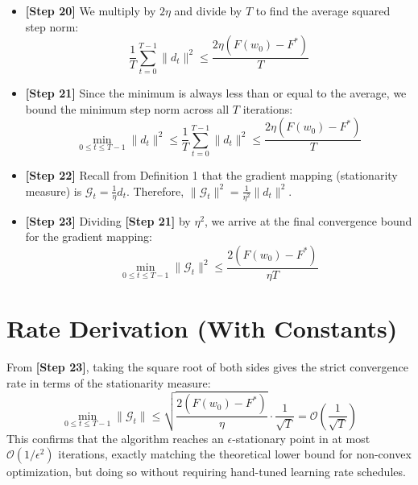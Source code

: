 \documentclass[11pt]{article}
\begin{document}
\begin{itemize}
    \item \textbf{[Step 20]} We multiply by $2\eta$ and divide by $T$ to find the average squared step norm:
    \begin{equation}
        \frac{1}{T} \sum_{t=0}^{T-1} \|d_t\|^2 \leq \frac{2\eta (F(w_0) - F^*)}{T}
    \end{equation}
    
    \item \textbf{[Step 21]} Since the minimum is always less than or equal to the average, we bound the minimum step norm across all $T$ iterations:
    \begin{equation}
        \min_{0 \leq t \leq T-1} \|d_t\|^2 \leq \frac{1}{T} \sum_{t=0}^{T-1} \|d_t\|^2 \leq \frac{2\eta (F(w_0) - F^*)}{T}
    \end{equation}
    
    \item \textbf{[Step 22]} Recall from Definition 1 that the gradient mapping (stationarity measure) is $\mathcal{G}_t = \frac{1}{\eta} d_t$. Therefore, $\|\mathcal{G}_t\|^2 = \frac{1}{\eta^2} \|d_t\|^2$.
    
    \item \textbf{[Step 23]} Dividing \textbf{[Step 21]} by $\eta^2$, we arrive at the final convergence bound for the gradient mapping:
    \begin{equation}
        \min_{0 \leq t \leq T-1} \|\mathcal{G}_t\|^2 \leq \frac{2(F(w_0) - F^*)}{\eta T}
    \end{equation}
\end{itemize}

\section*{Rate Derivation (With Constants)}
From \textbf{[Step 23]}, taking the square root of both sides gives the strict convergence rate in terms of the stationarity measure:
\begin{equation}
    \min_{0 \leq t \leq T-1} \|\mathcal{G}_t\| \leq \sqrt{\frac{2(F(w_0) - F^*)}{\eta}} \cdot \frac{1}{\sqrt{T}} = \mathcal{O}\left(\frac{1}{\sqrt{T}}\right)
\end{equation}
This confirms that the algorithm reaches an $\epsilon$-stationary point in at most $\mathcal{O}(1/\epsilon^2)$ iterations, exactly matching the theoretical lower bound for non-convex optimization, but doing so without requiring hand-tuned learning rate schedules.
\end{document}

